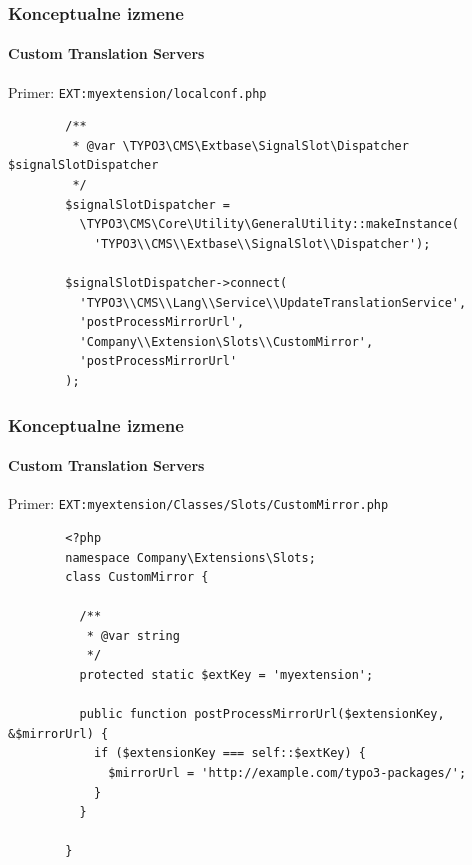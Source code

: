 
\begin{frame}[fragile]
	\frametitle{Konceptualne izmene}
	\framesubtitle{Custom Translation Servers}

	Primer: \texttt{EXT:myextension/localconf.php}

	\lstset{
		basicstyle=\tiny\ttfamily
	}

	\begin{lstlisting}
		/**
		 * @var \TYPO3\CMS\Extbase\SignalSlot\Dispatcher $signalSlotDispatcher
		 */
		$signalSlotDispatcher =
		  \TYPO3\CMS\Core\Utility\GeneralUtility::makeInstance(
		    'TYPO3\\CMS\\Extbase\\SignalSlot\\Dispatcher');

		$signalSlotDispatcher->connect(
		  'TYPO3\\CMS\\Lang\\Service\\UpdateTranslationService',
		  'postProcessMirrorUrl',
		  'Company\\Extension\Slots\\CustomMirror',
		  'postProcessMirrorUrl'
		);
	\end{lstlisting}

\end{frame}


\begin{frame}[fragile]
	\frametitle{Konceptualne izmene}
	\framesubtitle{Custom Translation Servers}

	Primer: \texttt{EXT:myextension/Classes/Slots/CustomMirror.php}

	\lstset{
		basicstyle=\tiny\ttfamily
	}

	\begin{lstlisting}
		<?php
		namespace Company\Extensions\Slots;
		class CustomMirror {

		  /**
		   * @var string
		   */
		  protected static $extKey = 'myextension';

		  public function postProcessMirrorUrl($extensionKey, &$mirrorUrl) {
		    if ($extensionKey === self::$extKey) {
		      $mirrorUrl = 'http://example.com/typo3-packages/';
		    }
		  }

		}
	\end{lstlisting}

\end{frame}

